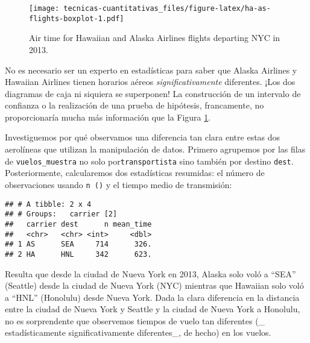 \documentclass[
]{book}
\newenvironment{Shaded}{\begin{snugshade}}{\end{snugshade}}
\newcommand{\DataTypeTok}[1]{\textcolor[rgb]{0.13,0.29,0.53}{#1}}
\newcommand{\KeywordTok}[1]{\textcolor[rgb]{0.13,0.29,0.53}{\textbf{#1}}}
\newcommand{\NormalTok}[1]{#1}
\newcommand{\OperatorTok}[1]{\textcolor[rgb]{0.81,0.36,0.00}{\textbf{#1}}}
\newcommand{\OtherTok}[1]{\textcolor[rgb]{0.56,0.35,0.01}{#1}}
\newcommand{\StringTok}[1]{\textcolor[rgb]{0.31,0.60,0.02}{#1}}
\begin{document}
\begin{figure}
\centering
\texttt{[image: tecnicas-cuantitativas\_files/figure-latex/ha-as-flights-boxplot-1.pdf]}
\caption{\label{fig:ha-as-flights-boxplot}Air time for Hawaiian and Alaska Airlines flights departing NYC in 2013.}
\end{figure}

No es necesario ser un experto en estadísticas para saber que Alaska Airlines y Hawaiian Airlines tienen horarios aéreos \emph{significativamente} diferentes. ¡Los dos diagramas de caja ni siquiera se superponen! La construcción de un intervalo de confianza o la realización de una prueba de hipótesis, francamente, no proporcionaría mucha más información que la Figura \ref{fig:ha-as-flights-boxplot}.

Investiguemos por qué observamos una diferencia tan clara entre estas dos aerolíneas que utilizan la manipulación de datos. Primero agrupemos por las filas de \texttt{vuelos\_muestra} no solo por\texttt{transportista} sino también por destino \texttt{dest}. Posteriormente, calcularemos dos estadísticas resumidas: el número de observaciones usando \texttt{n\ ()} y el tiempo medio de transmisión:

\begin{Shaded}
\end{Shaded}

\begin{verbatim}
## # A tibble: 2 x 4
## # Groups:   carrier [2]
##   carrier dest      n mean_time
##   <chr>   <chr> <int>     <dbl>
## 1 AS      SEA     714      326.
## 2 HA      HNL     342      623.
\end{verbatim}

Resulta que desde la ciudad de Nueva York en 2013, Alaska solo voló a ``SEA'' (Seattle) desde la ciudad de Nueva York (NYC) mientras que Hawaiian solo voló a ``HNL'' (Honolulu) desde Nueva York. Dada la clara diferencia en la distancia entre la ciudad de Nueva York y Seattle y la ciudad de Nueva York a Honolulu, no es sorprendente que observemos tiempos de vuelo tan diferentes (\_ estadísticamente significativamente diferentes\_, de hecho) en los vuelos.
\end{document}
